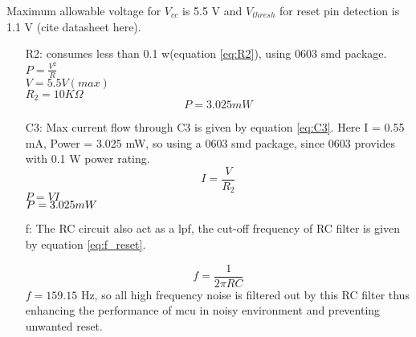 	Maximum allowable voltage for $V_{cc}$ is 5.5 V and $ V_{thresh}$ for reset pin detection is 1.1 V (cite datasheet here). 
	\begin{itemize}
		\item[R2:] consumes less than 0.1 w(equation \ref{eq:R2}), using 0603 \gls{smd} package.
				\\$P = \frac{V^{2}}{R} $\\
				$V = 5.5 V (max)$\\
				$R_{2} = 10 K\Omega $\\
				\begin{equation}
				P = 3.025 mW \label{eq:R2}
				\end{equation}	
		\item[C3:]	Max current flow through C3 is given by equation \ref{eq:C3}. Here I = 0.55 mA, Power = 3.025 mW, so using a 0603 \gls{smd} package, since 0603 provides with 0.1 W power rating.
			\begin{equation}
				I = \frac{V}{R_{2}}
				\label{eq:C3}
			\end{equation}	
			$ P = VI $	\\
			$ P = 3.025 mW \\ $
		\item[f:] The RC circuit also act as a \gls{lpf}, the cut-off frequency of RC filter is given by equation \ref{eq:f_reset}.
		
			\begin{equation}
				f = \frac{1}{2\pi RC}
				\label{eq:f_reset}
			\end{equation}	
			$ f = 159.15 $ Hz, so all high frequency noise is filtered out by this RC filter thus enhancing the performance of \gls{mcu} in noisy environment and preventing unwanted reset.				
	\end{itemize}
	
